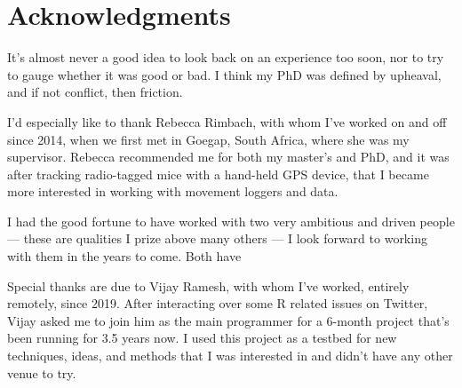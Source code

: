 



\bigskip

\begingroup
\let\clearpage\relax
\let\cleardoublepage\relax
\let\cleardoublepage\relax
\chapter*{Acknowledgments}

It's almost never a good idea to look back on an experience too soon, nor to try to gauge whether it was good or bad.
I think my PhD was defined by upheaval, and if not conflict, then friction.

I'd especially like to thank Rebecca Rimbach, with whom I've worked on and off since 2014, when we first met in Goegap, South Africa, where she was my supervisor.
Rebecca recommended me for both my master's and PhD, and it was after tracking radio-tagged mice with a hand-held GPS device, that I became more interested in working with movement loggers and data.

\medskip

I had the good fortune to have worked with two very ambitious and driven people --- these are qualities I prize above many others --- I look forward to working with them in the years to come.
Both have 

Special thanks are due to Vijay Ramesh, with whom I've worked, entirely remotely, since 2019.
After interacting over some R related issues on Twitter, Vijay asked me to join him as the main programmer for a 6-month project that's been running for 3.5 years now.
I used this project as a testbed for new techniques, ideas, and methods that I was interested in and didn't have any other venue to try.

